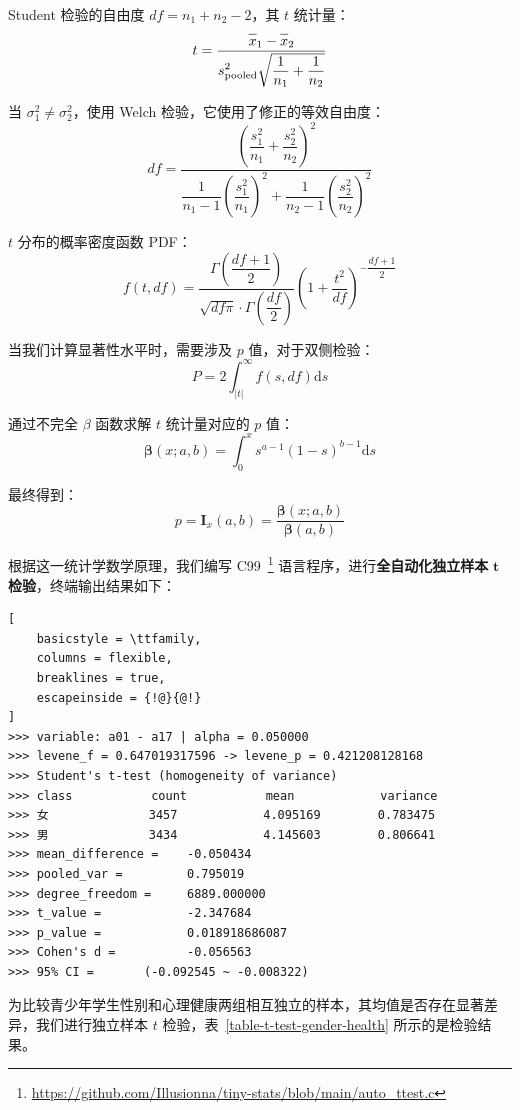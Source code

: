 \documentclass[zihao = -4, linespread = 1.5]{article}
\newcommand{\barline}[1]{\overline{#1\rule{0pt}{1.5ex}}}
\renewcommand{\d}{\mathrm{d}}
\begin{document}
Student 检验的自由度 $df=n_1+n_2-2$，其 $t$ 统计量：
\[ t=\dfrac{\barline{x}_1-\barline{x}_2}{\displaystyle s_{\text{pooled}}^2\sqrt{\dfrac{1}{n_1}+\dfrac{1}{n_2}}} \]

当 $\sigma_1^2\neq\sigma_2^2$，使用 Welch 检验，它使用了修正的等效自由度：
\[ df=\dfrac{\left(\dfrac{\displaystyle s_1^2}{n_1}+\dfrac{\displaystyle s_2^2}{n_2}\right)^2}{\dfrac{1}{n_1-1}\left(\dfrac{\displaystyle s_1^2}{n_1}\right)^2+\dfrac{1}{n_2-1}\left(\dfrac{\displaystyle s_2^2}{n_2}\right)^2} \]

$t$ 分布的概率密度函数 PDF：
\[ f(t,df)=\dfrac{\Gamma\left(\dfrac{df+1}{2}\right)}{\displaystyle\sqrt{df\pi}\cdot\Gamma\left(\dfrac{df}{2}\right)}\left(1+\dfrac{t^2}{df}\right)^{\displaystyle-\dfrac{df+1}{2}} \]

当我们计算显著性水平时，需要涉及 $p$ 值，对于双侧检验：
\[ P=2\int_{|t|}^{\infty}f(s,df)\d s \]

通过不完全 $\beta$ 函数求解 $t$ 统计量对应的 $p$ 值：
\[ \bm{\beta}(x;a,b)=\int_{0}^{x}s^{a-1}(1-s)^{b-1}\d s \]

最终得到：
\[ p=\bm{I}_x(a,b)=\dfrac{\bm{\beta}(x;a,b)}{\bm{\beta}(a,b)} \]

根据这一统计学数学原理，我们编写 C99~\footnote{\href{https://github.com/Illusionna/tiny-stats/blob/main/auto_ttest.c}{https://github.com/Illusionna/tiny-stats/blob/main/auto\_ttest.c}} 语言程序，进行\textbf{全自动化独立样本} $\bm{t}$ \textbf{检验}，终端输出结果如下：

\begin{lstlisting}[
    basicstyle = \ttfamily,
    columns = flexible,
    breaklines = true,
    escapeinside = {!@}{@!}
]
>>> variable: a01 - a17 | alpha = 0.050000
>>> levene_f = 0.647019317596 -> levene_p = 0.421208128168
>>> Student's t-test (homogeneity of variance)
>>> class           count           mean            variance       
>>> 女              3457            4.095169        0.783475       
>>> 男              3434            4.145603        0.806641       
>>> mean_difference =    -0.050434
>>> pooled_var =         0.795019
>>> degree_freedom =     6889.000000
>>> t_value =            -2.347684
>>> p_value =            0.018918686087
>>> Cohen's d =          -0.056563
>>> 95% CI =       (-0.092545 ~ -0.008322)
\end{lstlisting}


为比较青少年学生性别和心理健康两组相互独立的样本，其均值是否存在显著差异，我们进行独立样本 $t$ 检验，表~\ref{table-t-test-gender-health} 所示的是检验结果。
\end{document}
